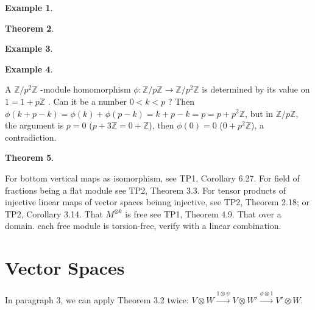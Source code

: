 \documentclass{article}
\newtheorem{theorem}{Theorem}[section]
\newtheorem{example}[theorem]{Example}
\begin{document}
\begin{example}
\end{example}

\begin{theorem}
\end{theorem}

\begin{example}
\end{example}

\begin{example}
\end{example}
A $ \mathbb{Z} / p^2 \mathbb{Z} $ -module homomorphism $ \phi: \mathbb{Z} / p\mathbb{Z} \rightarrow \mathbb{Z} / p^2 \mathbb{Z}$ is determined by its value on $1 = 1 + p \mathbb{Z}$ . Can it be a number $ 0 < k < p $ ? Then $ \phi(k + p - k) = \phi(k) + \phi(p - k) = k + p - k = p = p + p^2 \mathbb{Z} $, but in $\mathbb{Z}/p\mathbb{Z}$, the argument is $p = 0$ ($p + 3\mathbb{Z} = 0 + \mathbb{Z}$), then $\phi(0) = 0$ ($0 + p^2\mathbb{Z}$), a contradiction.

\begin{theorem}
\end{theorem}
For bottom vertical maps as isomorphism, see TP1, Corollary 6.27.
For field of fractions being a flat module see TP2, Theorem 3.3.
For tensor products of injective linear maps of vector spaces beinng injective, see TP2, Theorem 2.18; or TP2, Corollary 3.14. That $ M^{\otimes k} $ is free see TP1, Theorem 4.9. That over a domain. each free module is torsion-free, verify with a linear combination.

\section{Vector Spaces}

In paragraph 3, we can apply Theorem 3.2 twice: $ V \otimes W \xrightarrow{1 \otimes \psi} V \otimes W'\xrightarrow{\phi \otimes 1} V' \otimes W $.
\end{document}
